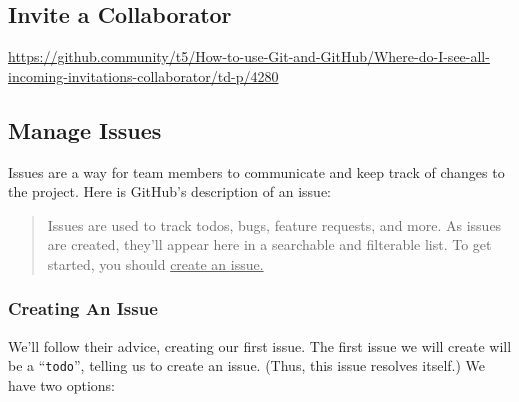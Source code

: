 \documentclass[11pt]{article}
\begin{document}
\subsection{Invite a Collaborator} 

\url{https://github.community/t5/How-to-use-Git-and-GitHub/Where-do-I-see-all-incoming-invitations-collaborator/td-p/4280}

\subsection{Manage Issues}

Issues are a way for team members to communicate and keep track of changes to the project.  Here is GitHub's description of an issue:~\cite{github-issues} \\

\begin{quote}
Issues are used to track todos, bugs, feature requests, and more. As issues are created, they'll appear here in a searchable and filterable list. To get started, you should \underline{create an issue.}
\end{quote} 

\subsubsection{Creating An Issue}
We'll follow their advice, creating our first issue. The first issue we will create will be a ``\texttt{todo}'', telling us to create an issue. (Thus, this issue resolves itself.) We have two options: 
\end{document}

